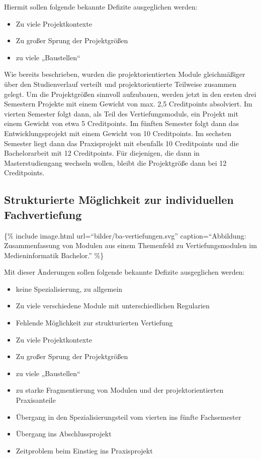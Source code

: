 Hiermit sollen folgende bekannte Defizite ausgeglichen werden:

\begin{itemize}
\tightlist
\item
  Zu viele Projektkontexte
\item
  Zu großer Sprung der Projektgrößen
\item
  zu viele „Baustellen``
\end{itemize}

Wie bereits beschrieben, wurden die projektorientierten Module
gleichmäßiger über den Studienverlauf verteilt und projektorientierte
Teilweise zusammen gelegt. Um die Projektgrößen sinnvoll aufzubauen,
werden jetzt in den ersten drei Semestern Projekte mit einem Gewicht von
max. 2,5 Creditpoints absolviert. Im vierten Semester folgt dann, als
Teil des Vertiefungsmoduls, ein Projekt mit einem Gewicht von etwa 5
Creditpoints. Im fünften Semester folgt dann das Entwicklungsprojekt mit
einem Gewicht von 10 Creditpoints. Im sechsten Semester liegt dann das
Praxisprojekt mit ebenfalls 10 Creditpoints und die Bachelorarbeit mit
12 Creditpoints. Für diejenigen, die dann in Masterstudiengang wechseln
wollen, bleibt die Projektgröße dann bei 12 Creditpoints.

\subsection{Strukturierte Möglichkeit zur individuellen
Fachvertiefung}\label{strukturierte-muxf6glichkeit-zur-individuellen-fachvertiefung}

\{\% include image.html url=``bilder/ba-vertiefungen.svg''
caption=``Abbildung: Zusammenfassung von Modulen aus einem Themenfeld zu
Vertiefungsmodulen im Medieninformatik Bachelor.'' \%\}

Mit dieser Änderungen sollen folgende bekannte Defizite ausgeglichen
werden:

\begin{itemize}
\tightlist
\item
  keine Spezialisierung, zu allgemein
\item
  Zu viele verschiedene Module mit unterschiedlichen Regularien
\item
  Fehlende Möglichkeit zur strukturierten Vertiefung
\item
  Zu viele Projektkontexte
\item
  Zu großer Sprung der Projektgrößen
\item
  zu viele „Baustellen``
\item
  zu starke Fragmentierung von Modulen und der projektorientierten
  Praxisanteile
\item
  Übergang in den Spezialisierungsteil vom vierten ins fünfte
  Fachsemester
\item
  Übergang ins Abschlussprojekt
\item
  Zeitproblem beim Einstieg ins Praxisprojekt
\end{itemize}

